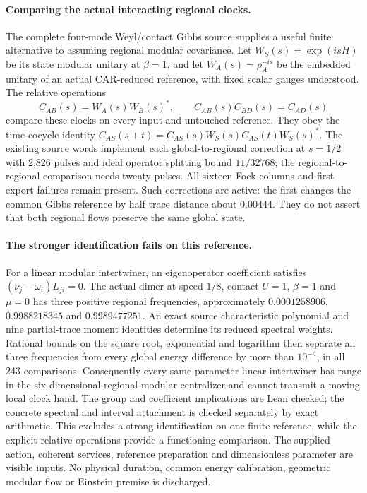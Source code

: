 \paragraph{Comparing the actual interacting regional clocks.}
The complete four-mode Weyl/contact Gibbs source supplies a useful finite
alternative to assuming regional modular covariance.  Let
$W_S(s)=\exp(isH)$ be its state modular unitary at $\beta=1$, and let
$W_A(s)=\rho_A^{-is}$ be the embedded unitary of an actual CAR-reduced
reference, with fixed scalar gauges understood.  The relative operations
\[
 C_{AB}(s)=W_A(s)W_B(s)^*,\qquad
 C_{AB}(s)C_{BD}(s)=C_{AD}(s)
\]
compare these clocks on every input and untouched reference.  They obey
the time-cocycle identity
$C_{AS}(s+t)=C_{AS}(s)W_S(s)C_{AS}(t)W_S(s)^*$.
The existing source words implement each global-to-regional correction at
$s=1/2$ with 2,826 pulses and ideal operator splitting bound $11/32768$;
the regional-to-regional comparison needs twenty pulses.  All sixteen
Fock columns and first export failures remain present.  Such corrections
are active: the first changes the common Gibbs reference by half trace
distance about $0.00444$.  They do not assert that both regional flows
preserve the same global state.

\paragraph{The stronger identification fails on this reference.}
For a linear modular intertwiner, an eigenoperator coefficient satisfies
$(\nu_j-\omega_i)L_{ji}=0$.  The actual dimer at speed $1/8$, contact
$U=1$, $\beta=1$ and $\mu=0$ has three positive regional frequencies,
approximately $0.0001258906$, $0.9988218345$ and $0.9989477251$.
An exact source characteristic polynomial and nine partial-trace moment
identities determine its reduced spectral weights.  Rational bounds on
the square root, exponential and logarithm then separate all three
frequencies from every global energy difference by more than $10^{-4}$,
in all 243 comparisons.  Consequently every same-parameter linear
intertwiner has range in the six-dimensional regional modular
centralizer and cannot transmit a moving local clock hand.
The group and coefficient implications are Lean checked; the concrete
spectral and interval attachment is checked separately by exact arithmetic.
This excludes a strong identification on one finite reference, while the
explicit relative operations provide a functioning comparison.  The
supplied action, coherent services, reference preparation and dimensionless
parameter are visible inputs.  No physical duration, common energy
calibration, geometric modular flow or Einstein premise is discharged.
